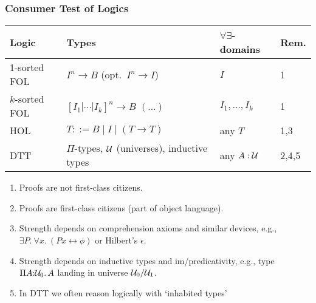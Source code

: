 \documentclass[handout]{beamer}
\newcommand{\depi}[3]{\Pi{#1{:}#2.\,#3}}
\newcommand{\UU}{{\cal U}}
\begin{document}
\frame
  {

    \frametitle{Consumer Test of Logics}

    \begin{tabular}{|l|p{}|l|l|}
\hline
Logic & Types & $\forall\exists$-domains & Rem.\\
\hline
1-sorted FOL & $I^n \to B$ (opt.\ $I^n \to I$)& $I$  & 1\\
\hline
$k$-sorted FOL& $[I_1 |\cdots| I_k]^n \to B$ $(\ldots)$  & $I_1,\ldots,I_k$ & 1\\
\hline
HOL & $T ::= B \mid I \mid (T{\to}T)$ & any $T$ & 1,3\\
\hline
DTT & $\Pi$-types, $\UU$ (universes), inductive types& any $A:\UU$   & 2,4,5\\
\hline
\end{tabular}

\begin{enumerate}
\item Proofs are not first-class citizens.
\item Proofs are first-class citizens (part of object language).
\item Strength depends on comprehension axioms and similar devices,
e.g., $\exists P.~\forall x.~ (Px \leftrightarrow \phi)$ or Hilbert's $\epsilon$.
\item Strength depends on inductive types and im/predicativity, e.g.,
type $\depi{A}{\UU_0}{A}$ landing in universe $\UU_0 / \UU_1$.
\item In DTT we often reason logically with `inhabited types'
\end{enumerate}
 }
\end{document}
